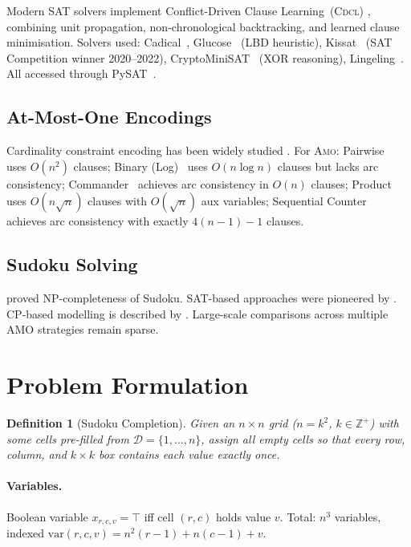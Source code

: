 \documentclass[preprint,10pt,authoryear]{elsarticle}
\newtheorem{definition}{Definition}[section]
\newcommand{\AMO}{\textsc{Amo}}
\newcommand{\CDCL}{\textsc{Cdcl}}
\begin{document}
Modern SAT solvers implement Conflict-Driven Clause Learning~(\CDCL{})
\citep{Moskewicz2001}, combining unit propagation, non-chronological
backtracking, and learned clause minimisation.
Solvers used: Cadical~\citep{Biere2019},
Glucose~\citep{Audemard2009} (LBD heuristic),
Kissat~\citep{Biere2020} (SAT Competition winner 2020--2022),
CryptoMiniSAT~\citep{Soos2009} (XOR reasoning), Lingeling~\citep{Biere2013}.
All accessed through PySAT~\citep{Ignatiev2018}.

\subsection{At-Most-One Encodings}

Cardinality constraint encoding has been widely studied
\citep{Sinz2005,Bailleux2003,Klieber2007,Chen2010}.
For \AMO{}: Pairwise~\citep{Cook1971} uses $O(n^2)$ clauses; Binary
(Log)~\citep{Frisch2010} uses $O(n\log n)$ clauses but lacks arc consistency;
Commander~\citep{Klieber2007} achieves arc consistency in $O(n)$ clauses;
Product~\citep{Chen2010} uses $O(n\sqrt{n})$ clauses with $O(\sqrt{n})$ aux
variables; Sequential Counter~\citep{Sinz2005} achieves arc consistency with
exactly $4(n-1)-1$ clauses.

\subsection{Sudoku Solving}

\citet{Yato2003} proved NP-completeness of Sudoku.
SAT-based approaches were pioneered by \citet{Lynce2006}.
CP-based modelling is described by \citet{Simonis2005}.
Large-scale comparisons across multiple AMO strategies remain sparse.

\section{Problem Formulation}
\label{sec:formulation}

\begin{definition}[Sudoku Completion]
Given an $n\!\times\!n$ grid ($n=k^2$, $k\in\mathbb{Z}^+$) with some cells
pre-filled from $\mathcal{D}=\{1,\ldots,n\}$, assign all empty cells so that
every row, column, and $k\!\times\!k$ box contains each value exactly once.
\end{definition}

\paragraph{Variables.}
Boolean variable $x_{r,c,v}=\top$ iff cell $(r,c)$ holds value $v$.
Total: $n^3$ variables, indexed $\mathrm{var}(r,c,v)=n^2(r{-}1)+n(c{-}1)+v$.
\end{document}
